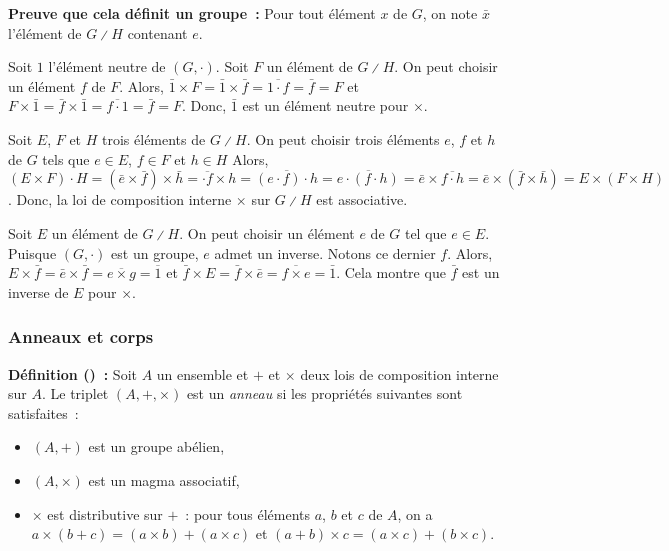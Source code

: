     \done

\medskip

\noindent\textbf{Preuve que cela définit un groupe :}
    Pour tout élément $x$ de $G$, on note $\bar{x}$ l'élément de $G \divslash H$ contenant $e$.

    Soit $1$ l'élément neutre de $(G, \cdot)$. 
    Soit $F$ un élément de $G \divslash H$. 
    On peut choisir un élément $f$ de $F$.
    Alors, $\bar{1} \times F = \bar{1} \times \bar{f} = \overline{1 \cdot f} = \bar{f} = F$ et $F \times \bar{1} = \bar{f} \times \bar{1} = \overline{f \cdot 1} = \bar{f} = F$.
    Donc, $\bar{1}$ est un élément neutre pour $\times$.

    Soit $E$, $F$ et $H$ trois éléments de $G \divslash H$.
    On peut choisir trois éléments $e$, $f$ et $h$ de $G$ tels que $e \in E$, $f \in F$ et $h \in H$
    Alors, $(E \times F) \cdot H = (\bar{e} \times \bar{f}) \times \bar{h} = \overline{ \cdot f} \times h = \overline{(e \cdot f) \cdot h} = \overline{e \cdot (f \cdot h)} = \bar{e} \times \overline{f \cdot h} = \bar{e} \times (\bar{f} \times \bar{h}) = E \times (F \times H)$.
    Donc, la loi de composition interne $\times$ sur $G \divslash H$ est associative.

    Soit $E$ un élément de $G \divslash H$.
    On peut choisir un élément $e$ de $G$ tel que $e \in E$.
    Puisque $(G, \cdot)$ est un groupe, $e$ admet un inverse.
    Notons ce dernier $f$.
    Alors, $E \times \bar{f} = \bar{e} \times \bar{f} = \overline{e \times g} = \overline{1}$ et $\bar{f} \times E = \bar{f} \times \bar{e} = \overline{f \times e} = \bar{1}$.
    Cela montre que $\bar{f}$ est un inverse de $E$ pour $\times$.
    
    \done

\subsubsection{Anneaux et corps}

\noindent\textbf{Définition () :} Soit $A$ un ensemble et $+$ et $\times$ deux lois de composition interne sur $A$. 
    Le triplet $(A, +, \times)$ est un \textit{anneau} si les propriétés suivantes sont satisfaites : 
    \begin{itemize}[nosep]
        \item $(A,+)$ est un groupe abélien,
        \item $(A, \times)$ est un magma associatif,
        \item $\times$ est distributive sur $+$ : pour tous éléments $a$, $b$ et $c$ de $A$, on a $a \times (b + c) = (a \times b) + (a \times c)$ et $(a + b) \times c = (a \times c) + (b \times c)$.
    \end{itemize}


